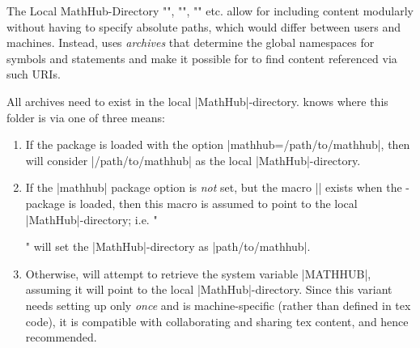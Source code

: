 \begin{sfragment}{The Local MathHub-Directory}
    \stexcode"\usemodule", \stexcode"\importmodule", 
    \stexcode"" etc. allow for 
    including content modularly without having to specify absolute
    paths, which would differ between users and machines. Instead,
    \sTeX uses \emph{archives} that determine the global
    namespaces for symbols and statements and make it possible
    for \sTeX to find content referenced via such URIs.

    All \sTeX archives need to exist in the local |MathHub|-directory.
    \sTeX knows where this folder is via one of three means:

    \begin{enumerate}
        \item If the \sTeX package is loaded with the option
            |mathhub=/path/to/mathhub|, then \sTeX will consider
            |/path/to/mathhub| as the local |MathHub|-directory.
        \item If the |mathhub| package option is \emph{not}
            set, but the macro |\mathhub| exists when the
            \sTeX-package is loaded, then this macro is
            assumed to point to the local |MathHub|-directory; i.e.
            \stexcode"\def\mathhub{/path/to/mathhub}\usepackage{stex}"
            will set the |MathHub|-directory as |path/to/mathhub|.
        \item Otherwise, \sTeX will attempt to retrieve the
            system variable |MATHHUB|, assuming it will
            point to the local |MathHub|-directory. Since this
            variant needs setting up only \emph{once} and is 
            machine-specific (rather than defined in tex code), 
            it is compatible with collaborating and sharing tex 
            content, and hence recommended.
    \end{enumerate}
\end{sfragment}

